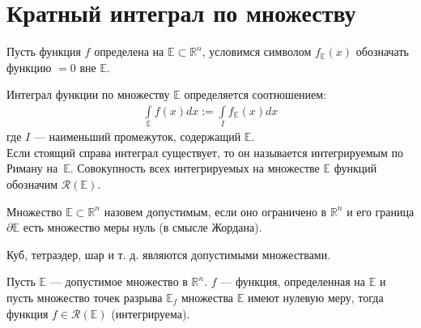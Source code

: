 \begin{comment}
  Эта теорема при $n = 1$ обычно устанавливается в разделе ``определенный
  интеграл''. В общем случае доказывается аналогично.
\end{comment}

\section{Кратный интеграл по множеству}
Пусть функция $f$ определена на $\mathbb{E} \subset \mathbb{R}^n$, условимся
символом $f_{\mathbb{E}}(x)$ обозначать функцию $= 0$ вне $\mathbb{E}$.
\begin{definition}
  \label{def531}
  Интеграл функции по множеству $\mathbb{E}$ определяется соотношением:
  \begin{gather}
    \int\limits_{\mathbb{E}} f(x) dx := \int\limits_I f_{\mathbb{E}}(x) dx
    \label{def531:eq1}
  \end{gather}
  где $I$ --- наименьший промежуток, содержащий $\mathbb{E}$. \\
  Если стоящий справа интеграл существует, то он называется интегрируемым по
  Риману на~$\mathbb{E}$.
  Совокупность всех интегрируемых на множестве $\mathbb{E}$ функций обозначим
  $\mathcal{R}(\mathbb{E})$.
\end{definition}

\begin{definition}
  Множество $\mathbb{E} \subset \mathbb{R}^n$ назовем допустимым, если оно
  ограничено в $\mathbb{R}^n$ и его граница $\partial \mathbb{E}$ есть
  множество меры нуль (в смысле Жордана).
\end{definition}

\begin{example}
  Куб, тетраэдер, шар и т. д. являются допустимыми множествами.
\end{example}

\begin{comment}
  Граница $\partial \mathbb{E}$ множества $\mathbb{E}$ состоит из точек, в
  любой окрестности которых имеются как точки из $\mathbb{E}$, так и точки из
  дополнения $\mathbb{E}$ до $\mathbb{R}^n$.
\end{comment}

\begin{theorem}
  Пусть $\mathbb{E}$ --- допустимое множество в $\mathbb{R}^n$. $f$ ---
  функция, определенная на $\mathbb{E}$ и пусть множество точек разрыва
  $\mathbb{E}_f$ множества $\mathbb{E}$ имеют нулевую меру, тогда функция $f
  \in \mathcal{R}(\mathbb{E})$ (интегрируема).
\end{theorem}


